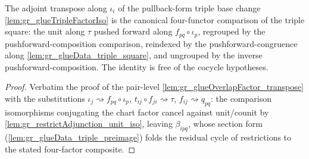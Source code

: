 \begin{lemma}

  \label{lem:gr_glueTripleFactor_transpose}
  The adjoint transpose along \(\iota_i\) of the pullback-form triple base change
  \cref{lem:gr_glueTripleFactorIso} is the canonical four-functor comparison of the
  triple square: the unit along \(\tau\) pushed forward along \(f_{pq}\circ\iota_p\),
  regrouped by the pushforward-composition comparison, reindexed by the
  pushforward-congruence along \cref{lem:gr_glueData_triple_square}, and ungrouped by the
  inverse pushforward-composition. The identity is free of the cocycle hypotheses.
\end{lemma}
\begin{proof}
    \leanok
  Verbatim the proof of the pair-level \cref{lem:gr_glueOverlapFactor_transpose} with the
  substitutions \(\iota_j \rightsquigarrow f_{pq}\circ\iota_p\),
  \(t_{ij}\circ f_{ji}\rightsquigarrow \tau\), \(f_{ij}\rightsquigarrow q_{pq}\): the
  comparison isomorphisms conjugating the chart factor cancel against unit/counit by
  \cref{lem:gr_restrictAdjunction_unit_iso}, leaving \(\beta_{ipq}\), whose section form
  (\cref{lem:gr_glueData_triple_preimage}) folds the residual cycle of restrictions to
  the stated four-factor composite.
\end{proof}

